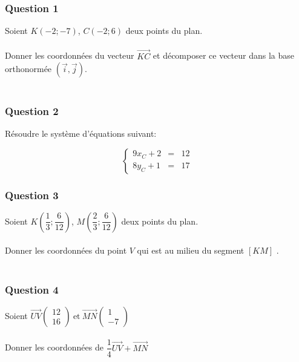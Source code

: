 \documentclass[t,12pt]{beamer}
\newcommand{\V}{\overrightarrow}
\begin{document}
\begin{frame}
\frametitle{Question 1}

Soient $K(-2;-7)$, $C(-2;6)$ deux points du plan.\\\hfill\\ 


Donner les coordonnées du vecteur $\V{KC}$ et décomposer ce vecteur dans la base orthonormée  $(\V{i}, \V{j})$.\\\hfill\\ 

\end{frame}

\begin{frame}
\frametitle{Question 2}
Résoudre  le système d'équations suivant:

$$\left \{
\begin{array}{rcl}
9x_C+ 2&= & 12 \\
8y_C+1&= & 17
\end{array}
\right.$$
\end{frame}

\begin{frame}
\frametitle{Question 3}

Soient $K(\dfrac{1}{3};\dfrac{6}{12})$, $M(\dfrac{2}{3};\dfrac{6}{12})$ deux points du plan.\\\hfill\\ 


Donner les coordonnées du point $V$ qui est au milieu du segment $[KM]$ .\\\hfill\\ 

\end{frame}

\begin{frame}
\frametitle{Question 4}


Soient $
\V{UV}\begin{pmatrix}
 12 \\
16
\end{pmatrix} \  \text{et}  \ \V{MN}\begin{pmatrix}
 1 \\
-7
\end{pmatrix}
$\\\hfill\\[0.5cm]

Donner les coordonnées de  $ \dfrac{1}{4}\V{UV} + \V{MN} $
\end{frame}
\end{document}
